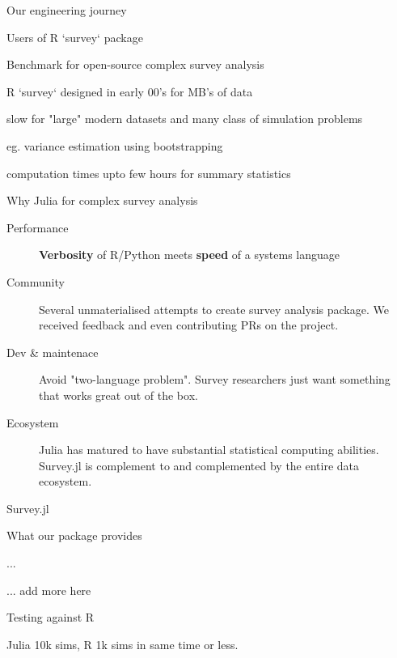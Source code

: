 \documentclass[aspectratio=169]{beamer}
\newenvironment{wideitemize}{\itemize\addtolength{\itemsep}{10pt}}{\enditemize}
\begin{document}
\begin{frame}{Our engineering journey}
\begin{wideitemize}
  \item Users of R `survey` package
  	\begin{wideitemize}
  		\item Benchmark for open-source complex survey analysis
  	\end{wideitemize}	
  \item R `survey` designed in early 00's for MB's of data 
	\begin{wideitemize}
  		\item slow for "large" modern datasets and many class of simulation problems
  		\item eg. variance estimation using bootstrapping
  		\item computation times upto few hours for summary statistics
  	\end{wideitemize}
\end{wideitemize}
\end{frame}
     
\begin{frame}{Why Julia for complex survey analysis}
	\begin{description}
		\item[Performance]  \textbf{Verbosity} of R/Python meets \textbf{speed}  of a systems language
		\item[Community] Several unmaterialised attempts to create survey analysis package. We received feedback and even contributing PRs on the project.\hyperlink{appendix_end}{}
		\item[Dev \& maintenace] Avoid "two-language problem". Survey researchers just want something that works great out of the box.
		\item[Ecosystem] Julia has matured to have substantial statistical computing abilities. Survey.jl is complement to and complemented by the entire data ecosystem.
	\end{description}
			
\end{frame}


\begin{frame}{Survey.jl}  
  \begin{description}
  \item What our package provides
  \item ...
  \item ... add more here
  \item Testing against R
  \item Julia 10k sims, R 1k sims in same time or less.
    \end{description}
\end{frame}
\end{document}
